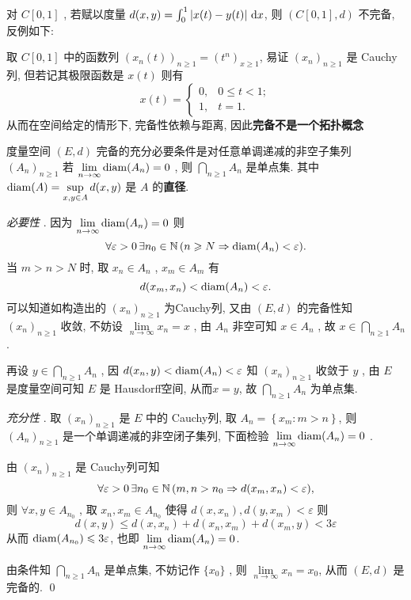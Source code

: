\begin{Remark}
	对 $ C[0, 1] $ , 若赋以度量 $ d(x, y)=\int_{0}^{1}\left| x(t)-y(t) \right| \,\mathrm{d} x $, 则 $ (C[0, 1], d) $ 不完备, 反例如下:

	取 $ C[0, 1] $ 中的函数列 $ (x_{n}(t))_{n\geqslant1}=(t^{n})_{x\geqslant1} $, 易证  $ (x_{n})_{n\geqslant1} $ 是 Cauchy列, 但若记其极限函数是 $ x(t) $ 则有
	\[
		x(t)=\begin{cases}
			0, & 0\leqslant t<1; \\
			1, & t=1.
		\end{cases}
	\]
	从而在空间给定的情形下, 完备性依赖与距离, 因此\textbf{完备不是一个拓扑概念}
\end{Remark}
\begin{Theorem}
	度量空间 $ (E, d) $ 完备的充分必要条件是对任意单调递减的非空子集列 $ (A_{n})_{n\geqslant1} $ 若 $ \lim\limits_{n\to\infty}\operatorname{diam}(A_{n})=0 $ , 则 $ \bigcap\limits_{n\geqslant1}A_{n} $ 是单点集. 其中 $ \operatorname{diam}(A)=\sup\limits_{x,y\in A}d(x, y) $ 是 $ A $  的\textbf{直径}.
\end{Theorem}
\begin{Proof}
	\textsl{必要性} . 因为 $ \lim\limits_{n\to\infty}\operatorname{diam}(A_{n})=0 $ 则
	\[
		\forall \varepsilon>0\,\exists n_{0}\in\mathbb{N}\,(n\geqslant N\Rightarrow \operatorname{diam}(A_{n})<\varepsilon).
	\]
	当 $ m>n>N $ 时, 取 $ x_{n}\in A_{n} $ , $ x_{m}\in A_{m} $ 有
	\[
		d(x_{m}, x_{n})<\operatorname{diam}(A_{n})<\varepsilon.
	\]
	可以知道如构造出的 $ (x_{n})_{n\geqslant1} $ 为Cauchy列, 又由 $ (E, d) $ 的完备性知 $ (x_{n})_{n\geqslant1} $ 收敛, 不妨设 $\lim\limits_{n\to\infty}x_{n}=x$ , 由 $ A_{n} $ 非空可知 $ x\in A_{n} $ , 故 $ x\in\bigcap\limits_{n\geqslant1}A_{n} $ .

	再设 $ y\in\bigcap\limits_{n\geqslant1} A_{n} $ , 因 $ d(x_{n}, y)<\operatorname{diam}(A_{n})<\varepsilon $ 知 $ (x_{n})_{n\geqslant1} $ 收敛于 $ y $ , 由 $ E $ 是度量空间可知 $ E $ 是 Hausdorff空间, 从而$ x=y $, 故 $ \bigcap\limits_{n\geqslant1} A_{n} $ 为单点集.

	\textsl{充分性} . 取 $ (x_{n})_{n\geqslant1} $ 是 $ E $ 中的 Cauchy列, 取 $ A_{n}=\left\{ x_{m}:m>n \right\} $, 则 $ (A_{n})_{n\geqslant1} $ 是一个单调递减的非空闭子集列, 下面检验 $ \lim\limits_{n\to\infty}\operatorname{diam}(A_{n})=0 $ .

	由 $ (x_{n})_{n\geqslant1} $ 是 Cauchy列可知
	\[
		\forall \varepsilon>0\, \exists n_{0}\in\mathbb{N}\,(m, n>n_{0}\Rightarrow d(x_{m}, x_{n})<\varepsilon),
	\]
	则 $ \forall x, y\in A_{n_{0}} $ , 取 $ x_{n}, x_{m}\in A_{n_{0}} $ 使得 $ d(x, x_{n}), d(y, x_{m})<\varepsilon $ 则
	\[
		d(x, y)\leqslant d(x, x_{n})+d(x_{n}, x_{m})+d(x_{m}, y) < 3\varepsilon
	\]
	从而 $ \operatorname{diam}(A_{n_{0}})\leqslant3\varepsilon $, 也即 $\lim\limits_{n\to\infty} \operatorname{diam}(A_{n})=0 $.

	由条件知 $ \bigcap\limits_{n\geqslant1}A_{n} $ 是单点集, 不妨记作 $ \{ x_{0} \} $ , 则 $ \lim\limits_{n\to\infty}x_{n}=x_{0} $, 从而 $ (E, d) $  是完备的. \qed
\end{Proof}
